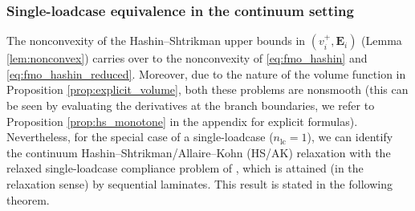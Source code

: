 \documentclass[preprint,3p]{elsarticle}
\newcommand{\tensf}[1]{\bm{\mathbf{#1}}}            %
\newcommand{\Ei}{\tensf{E}_i}                       %
\newcommand{\nlc}{n_\mathrm{lc}}                    %
\begin{document}
\subsubsection{Single-loadcase equivalence in the continuum setting}

The nonconvexity of the Hashin--Shtrikman upper bounds in $(v_i^+, \Ei)$ (Lemma \ref{lem:nonconvex}) carries over to the nonconvexity of \eqref{eq:fmo_hashin} and \eqref{eq:fmo_hashin_reduced}. Moreover, due to the nature of the volume function in Proposition \ref{prop:explicit_volume}, both these problems are nonsmooth (this can be seen by evaluating the derivatives at the branch boundaries, we refer to Proposition \ref{prop:hs_monotone} in the appendix for explicit formulas). Nevertheless, for the special case of a single-loadcase ($\nlc=1$), we can identify the continuum Hashin--Shtrikman/Allaire--Kohn (HS/AK) relaxation with the relaxed single-loadcase compliance problem of \citet{Allaire1993od}, which is attained (in the relaxation sense) by sequential laminates. This result is stated in the following theorem.
\end{document}
